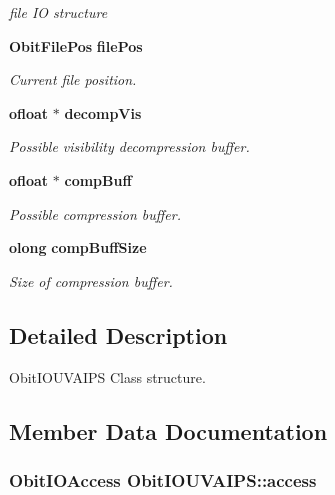 \begin{CompactItemize}
\begin{CompactList}\small\item\em file IO structure \item\end{CompactList}\item 
{\bf Obit\-File\-Pos} {\bf file\-Pos}
\begin{CompactList}\small\item\em Current file position. \item\end{CompactList}\item 
{\bf ofloat} $\ast$ {\bf decomp\-Vis}
\begin{CompactList}\small\item\em Possible visibility decompression buffer. \item\end{CompactList}\item 
{\bf ofloat} $\ast$ {\bf comp\-Buff}
\begin{CompactList}\small\item\em Possible compression buffer. \item\end{CompactList}\item 
{\bf olong} {\bf comp\-Buff\-Size}
\begin{CompactList}\small\item\em Size of compression buffer. \item\end{CompactList}\end{CompactItemize}


\subsection{Detailed Description}
Obit\-IOUVAIPS Class structure. 



\subsection{Member Data Documentation}
\subsubsection{\setlength{\rightskip}{0pt plus 5cm}Obit\-IOAccess {\bf Obit\-IOUVAIPS::access}}\label{structObitIOUVAIPS_o4}


